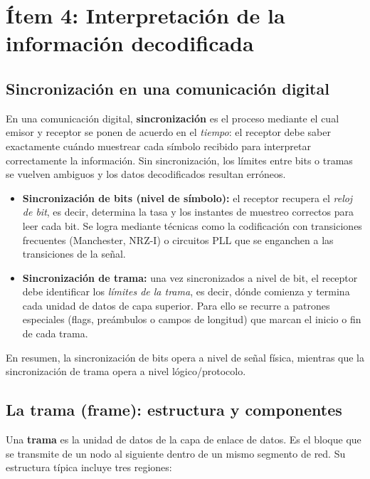 \documentclass[12pt,a4paper]{article}
\begin{document}
\section{Ítem 4: Interpretación de la información decodificada}

\subsection{Sincronización en una comunicación digital}

En una comunicación digital, \textbf{sincronización} es el proceso mediante el cual emisor y receptor se ponen de acuerdo en el \emph{tiempo}: el receptor debe saber exactamente cuándo muestrear cada símbolo recibido para interpretar correctamente la información. Sin sincronización, los límites entre bits o tramas se vuelven ambiguos y los datos decodificados resultan erróneos.

\begin{itemize}
  \item \textbf{Sincronización de bits (nivel de símbolo):} el receptor recupera el \emph{reloj de bit}, es decir, determina la tasa y los instantes de muestreo correctos para leer cada bit. Se logra mediante técnicas como la codificación con transiciones frecuentes (Manchester, NRZ-I) o circuitos PLL que se enganchen a las transiciones de la señal.
  \item \textbf{Sincronización de trama:} una vez sincronizados a nivel de bit, el receptor debe identificar los \emph{límites de la trama}, es decir, dónde comienza y termina cada unidad de datos de capa superior. Para ello se recurre a patrones especiales (flags, preámbulos o campos de longitud) que marcan el inicio o fin de cada trama.
\end{itemize}

En resumen, la sincronización de bits opera a nivel de señal física, mientras que la sincronización de trama opera a nivel lógico/protocolo.

\subsection{La trama (frame): estructura y componentes}

Una \textbf{trama} es la unidad de datos de la capa de enlace de datos. Es el bloque que se transmite de un nodo al siguiente dentro de un mismo segmento de red. Su estructura típica incluye tres regiones:
\end{document}
